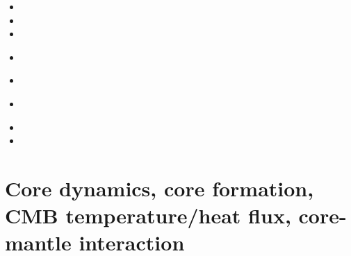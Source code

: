\begin{small}
\begin{itemize}
 \\
 \\
 \\
 \\
\item[\twothousandfourteen] 
\item[\twothousandfifteen] 
\item[\twothousandsixteen] 
\item[\twothousandseventeen] 
 \\ 
\item[\twothousandeighteen] 
 \\
\item[\twothousandnineteen] 
 \\
\item[\twothousandtwenty] 
\item[\twothousandtwentytwo] 
\end{itemize}
\end{small}





\section{Core dynamics, core formation, CMB temperature/heat flux, core-mantle interaction}

